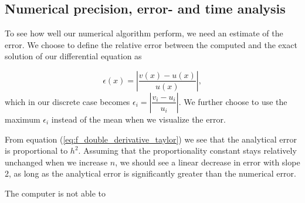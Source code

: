 \documentclass{emulateapj}
\begin{document}
\subsection{Numerical precision, error- and time analysis}

To see how well our numerical algorithm perform, we need an estimate of the error. We choose to define the relative error between the computed and the exact solution of our differential equation as \cite[Chapter 2]{compfys}

\begin{equation}\label{eq:max_rel_error}
    \epsilon(x) = \left| \dfrac{v(x) - u(x)}{u(x)}\right|,
\end{equation}
which in our discrete case becomes \(\epsilon_{i} = \left| \dfrac{v_{i} - u_{i}}{u_{i}}\right|\). We further choose to use the maximum \(\epsilon_{i}\) instead of the mean when we visualize the error.

From equation (\ref{eq:f_double_derivative_taylor}) we see that the analytical error is proportional to \(h^{2}\). Assuming that the proportionality constant stays relatively unchanged when we increase \(n\), we should see a linear decrease in error with slope 2, as long as the analytical error is significantly greater than the numerical error.
\newline

The computer is not able to 
%   
\end{document}
